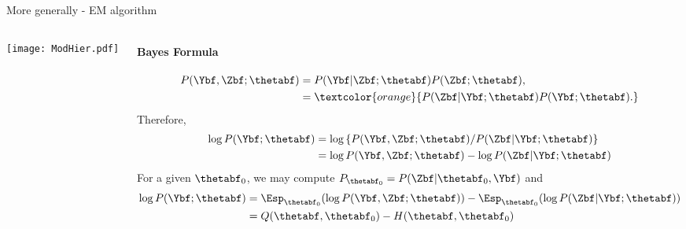 \begin{frame}{More generally - EM algorithm}
\begin{columns}
\begin{column}{0.2\textwidth}
\texttt{[image: ModHier.pdf]}
\end{column}
\begin{column}{0.8\textwidth}
\paragraph{Bayes Formula}
{\small
\begin{align*}
P(\Ybf, \Zbf;\thetabf) & = P(\Ybf\vert \Zbf; \thetabf) P(\Zbf; \thetabf),\\
& = \textcolor{orange}{P(\Zbf\vert \Ybf; \thetabf) P(\Ybf; \thetabf).}
\end{align*}
Therefore,
\begin{align*}
\log P(\Ybf; \thetabf) & = \log \left \lbrace P(\Ybf, \Zbf;\thetabf) / P(\Zbf\vert \Ybf; \thetabf) \right\rbrace\\
& = \log P(\Ybf, \Zbf;\thetabf) - \log P(\Zbf\vert \Ybf; \thetabf) \\
\end{align*}
For a given $\thetabf_0$, we may compute $P_{\thetabf_0}=P(\Zbf\vert \thetabf_0, \Ybf)$ and
\begin{align*}
\log P(\Ybf; \thetabf) &= \Esp_{\thetabf_0}(\log P(\Ybf, \Zbf;\thetabf)) - \Esp_{\thetabf_0}(\log P(\Zbf\vert \Ybf; \thetabf))\\
  & = Q(\thetabf, \thetabf_0) - H(\thetabf, \thetabf_0)
  \end{align*}}
\end{column}
\end{columns}
\end{frame}


